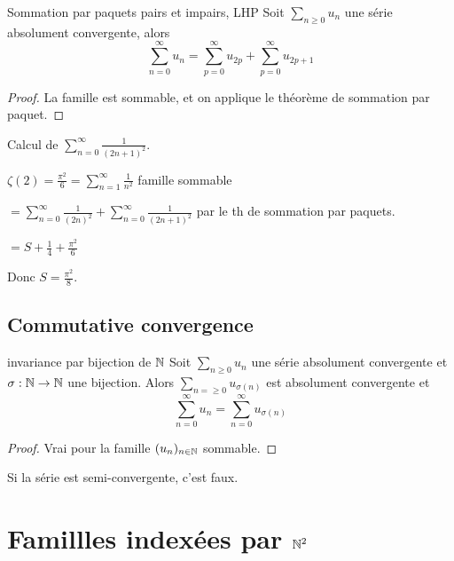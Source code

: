 \begin{proposition}{Sommation par paquets pairs et impairs, LHP}{}
    Soit $\sum_{n \geqslant 0} u_n$ une série absolument convergente, alors 
    $$\sum_{n  = 0 }^\infty u_n = \sum_{p = 0 }^\infty u_{2p} + \sum_{p = 0}^\infty u_{2p + 1}$$
\end{proposition}

\begin{proof}
    La famille est sommable, et on applique le théorème de sommation par paquet. 
\end{proof}

\begin{exemple}
    Calcul de $\displaystyle \sum_{n = 0 }^{\infty } \frac 1 {(2n + 1)^2}$. 

    $\displaystyle \zeta(2) = \frac{\pi^2} 6 = \sum_{n = 1}^\infty \frac 1 {n^2}$ famille sommable 

    $\displaystyle = \sum_{n = 0 }^{\infty } \frac 1 {(2n)^2} + \sum_{n = 0 }^{\infty } \frac 1 {(2n + 1)^2}$ par le th de sommation par paquets. 

    $\displaystyle = S + \frac 1 4 + \frac{\pi^2} 6$

    Donc $S = \frac {\pi^2} 8$.
\end{exemple}

\subsection{Commutative convergence }

\begin{theoreme}{invariance par bijection de $\mathbb{N}$}{}
    Soit $\displaystyle \sum_{n \geqslant 0} u_n$ une série absolument convergente et $\sigma : \mathbb{N} \to \mathbb{N}$ une bijection.
    Alors $\displaystyle \sum_{n =\geqslant 0} u_{\sigma(n)}$ est absolument convergente et
    $$\sum_{n = 0}^\infty u_n = \sum_{n = 0}^\infty u_{\sigma(n)}$$
\end{theoreme}

\begin{proof}
    Vrai pour la famille $(u_n)_{n \in \mathbb{N}}$ sommable. 
\end{proof}

\begin{remarque}
    Si la série est semi-convergente, c'est faux.
\end{remarque}


\section{Famillles indexées par \texorpdfstring{$\mathbb{N}^2$}{N²}}
